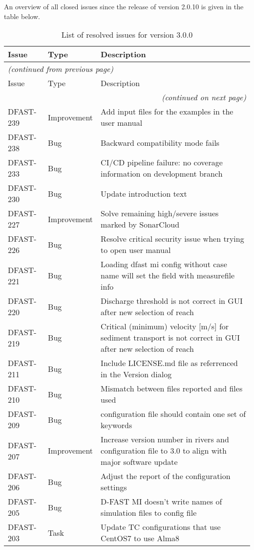 \documentclass[git]{deltares_manual}
\begin{document}
An overview of all closed issues since the release of version 2.0.10 is given in the table below.

\begin{longtable}{l|l|p{8cm}}
\caption{List of resolved issues for version 3.0.0} \\
Issue & Type & Description \\ \hline
\endfirsthead
\multicolumn{3}{l}{\textsl{(continued from previous page)}} \\
Issue & Type & Description \\ \hline
\endhead
\hline \multicolumn{3}{r}{\textsl{(continued on next page)}} \\
\endfoot
\endlastfoot 
DFAST-239 & Improvement & Add input files for the examples in the user manual \\
DFAST-238 & Bug & Backward compatibility mode fails \\
DFAST-233 & Bug & CI/CD pipeline failure: no coverage information on development branch \\
DFAST-230 & Bug & Update introduction text \\
DFAST-227 & Improvement & Solve remaining high/severe issues marked by SonarCloud \\
DFAST-226 & Bug & Resolve critical security issue when trying to open user manual \\
DFAST-221 & Bug & Loading dfast mi config without case name will set the field with measurefile info \\
DFAST-220 & Bug & Discharge threshold is not correct in GUI after new selection of reach \\
DFAST-219 & Bug & Critical (minimum) velocity [m/s] for sediment transport is not correct in GUI after new selection of reach \\
DFAST-211 & Bug & Include LICENSE.md file as referrenced in the Version dialog \\
DFAST-210 & Bug & Mismatch between files reported and files used \\
DFAST-209 & Bug & configuration file should contain one set of keywords \\
DFAST-207 & Improvement & Increase version number in rivers and configuration file to 3.0 to align with major software update \\
DFAST-206 & Bug & Adjust the report of the configuration settings \\
DFAST-205 & Bug & D-FAST MI doesn't write names of simulation files to config file \\
DFAST-203 & Task & Update TC configurations that use CentOS7 to use Alma8 \\

\end{longtable}
\end{document}
